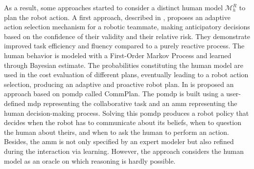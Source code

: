 As a result, some approaches started to consider a distinct human model $\mathcal{M}^R_h$ to plan the robot action.
A first approach, described in \cite{hoffman_effects_2007}, proposes an adaptive action selection mechanism for a robotic teammate, making anticipatory decisions based on the confidence of their validity and their relative risk. They demonstrate improved task efficiency and fluency compared to a purely reactive process. The human behavior is modeled with a First-Order Markov Process and learned through Bayesian estimate. The probabilities constituting the human model are used in the cost evaluation of different plans, eventually leading to a robot action selection, producing an adaptive and proactive robot plan. 
In \cite{unhelkar2020decision} is proposed an approach based on \acrfull{pomdp} called CommPlan. The \acrshort{pomdp} is built using a user-defined \acrfull{mdp} representing the collaborative task and an \acrfull{amm} representing the human decision-making process. Solving this \acrshort{pomdp} produces a robot policy that decides when the robot has to communicate about its beliefs, when to question the human about theirs, and when to ask the human to perform an action. Besides, the \acrshort{amm} is not only specified by an expert modeler but also refined during the interaction via learning. However, the approach considers the human model as an oracle on which reasoning is hardly possible.

